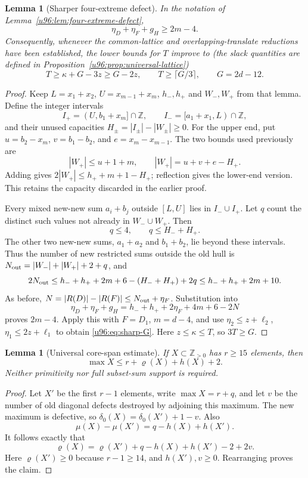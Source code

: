 \documentclass[11pt,a4paper]{article}
\newtheorem{lemma}[theorem]{Lemma}
\theoremstyle{remark}
\newcommand{\rhoD}{\varrho}
\begin{document}
\begin{lemma}[Sharper four-extreme defect]\label{u96:lem:four-sharp}
In the notation of Lemma~\ref{u96:lem:four-extreme-defect},
\[
 \boxed{\eta_D+\eta_F+g_H\geq2m-4.}
\]
Consequently, whenever the common-lattice and overlapping-translate
reductions have been established, the lower bounds for $T$ improve to
(the slack quantities are defined in Proposition~\ref{u96:prop:universal-lattice})
\begin{equation}
 T\geq\kappa+G-3z\geq G-2z,\qquad
 T\geq\lceil G/3\rceil,\qquad G=2d-12.
 \label{u96:eq:sharp-G}
\end{equation}
\end{lemma}
\begin{proof}
Keep $L=x_1+x_2$, $U=x_{m-1}+x_m$, $h_-,h_+$ and $W_-,W_+$ from that
lemma. Define the integer intervals
\[
 I_+=(U,b_1+x_m]\cap\mathbb Z,\qquad
 I_-=[a_1+x_1,L)\cap\mathbb Z,
\]
and their unused capacities $H_\pm=|I_\pm|-|W_\pm|\geq0$.
For the upper end, put $u=b_2-x_m$, $v=b_1-b_2$, and
$e=x_m-x_{m-1}$. The two bounds used previously are
\[
 |W_+|\leq u+1+m,\qquad
 |W_+|=u+v+e-H_+.
\]
Adding gives $2|W_+|\leq h_++m+1-H_+$; reflection gives the lower-end
version. This retains the capacity discarded in the earlier proof.

Every mixed new-new sum $a_i+b_j$ outside $[L,U]$ lies in $I_-\cup I_+$.
Let $q$ count the distinct such values not already in $W_-\cup W_+$.
Then
\[
 q\leq4,\qquad q\leq H_-+H_+.
\]
The other two new-new sums, $a_1+a_2$ and $b_1+b_2$, lie beyond these
intervals. Thus the number of new restricted sums outside the old hull is
$N_{\rm out}=|W_-|+|W_+|+2+q$, and
\[
 2N_{\rm out}
 \leq h_-+h_++2m+6-(H_-+H_+)+2q
 \leq h_-+h_++2m+10.
\]
As before, $N=|R(D)|-|R(F)|\leq N_{\rm out}+\eta_F$. Substitution into
\[
 \eta_D+\eta_F+g_H=h_-+h_++2\eta_F+4m+6-2N
\]
proves $2m-4$. Apply this with $F=D_1$, $m=d-4$, and use
$\eta_2\leq z+\ell_2$, $\eta_1\leq2z+\ell_1$ to obtain
\eqref{u96:eq:sharp-G}. Here $z\leq\kappa\leq T$, so $3T\geq G$.
\end{proof}

\begin{lemma}[Universal core-span estimate]\label{u96:lem:span96}
If $X\subset\mathbb Z_{>0}$ has $r\geq15$ elements, then
\[
 \max X\leq r+\rhoD(X)+h(X)+2.
\]
Neither primitivity nor full subset-sum support is required.
\end{lemma}
\begin{proof}
Let $X'$ be the first $r-1$ elements, write $\max X=r+q$, and let $v$
be the number of old diagonal defects destroyed by adjoining this maximum.
The new maximum is defective, so
$\delta_0(X)=\delta_0(X')+1-v$. Also
\[
 \mu(X)-\mu(X')=q-h(X)+h(X').
\]
It follows exactly that
\[
 \rhoD(X)=\rhoD(X')+q-h(X)+h(X')-2+2v.
\]
Here $\rhoD(X')\geq0$ because $r-1\geq14$, and $h(X'),v\geq0$.
Rearranging proves the claim.
\end{proof}
\end{document}
